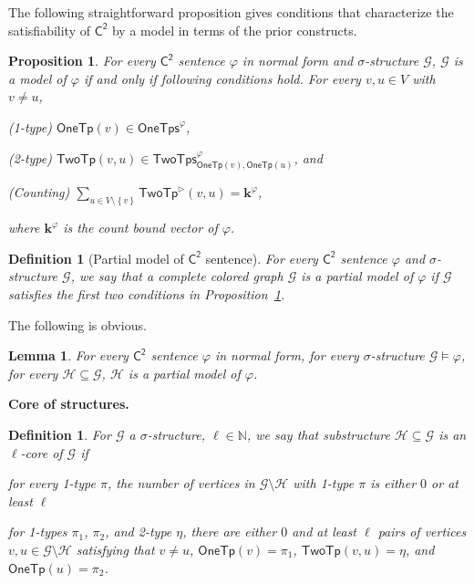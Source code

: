 \documentclass[10pt,a4paper]{article}
\newtheorem{lemma}[theorem]{Lemma}
\newtheorem{proposition}[theorem]{Proposition}
\newtheorem{definition}[theorem]{Definition}
\theoremstyle{definition}
\theoremstyle{remark}
\newcommand{\myparagraph}[1]{\medskip\noindent \textbf{#1.}}
\newcommand{\cG}{\mathcal{G}}
\newcommand{\cH}{\mathcal{H}}
\newcommand{\bbN}{\mathbb{N}}
\newcommand{\bfk}{\mathbf{k}}
\newcommand{\vocab}{\sigma}
\newcommand{\Ctwo}    {\mathsf{C^2}}
\newcommand{\onetypeof}{\mathsf{OneTp}}
\newcommand{\twotypeof}{\mathsf{TwoTp}}
\newcommand{\twotypes}{\mathsf{TwoTps}}
\newcommand{\Onetypes}{\mathsf{OneTps}}
\newcommand{\set}[1]         {\left\{ #1 \right\}}
\newcommand{\trif} {\triangleright}
\begin{document}
The following straightforward proposition gives
conditions that characterize the satisfiability of $\Ctwo$ by a model in terms of the prior constructs.
\begin{proposition}\label{prop:ctwo_graph}
    For every $\Ctwo$ sentence $\varphi$ in normal form and $\vocab$-structure $\cG$,
    $\cG$ is a model of $\varphi$ if and only if following conditions hold.
    For every $v, u \in V$ with $v \neq u$,
    \begin{compactitem}
        \item (1-type) $\onetypeof(v) \in \Onetypes^\varphi$,
        \item (2-type) $\twotypeof(v, u) \in \twotypes^\varphi_{\onetypeof(v), \onetypeof(u)}$, and
        \item (Counting) $\sum_{u \in V \setminus \set{v}} \twotypeof^\trif(v, u) = \bfk^\varphi$,
    \end{compactitem}
    where $\bfk^\varphi$ is the count bound vector of $\varphi$.
\end{proposition}

\begin{definition}[Partial model of $\Ctwo$ sentence] \label{def:partial}
    For every $\Ctwo$ sentence $\varphi$ and $\vocab$-structure $\cG$,
    we say that a complete colored graph $\cG$ is a \emph{partial model} of $\varphi$
    if $\cG$ satisfies the first two conditions in Proposition~\ref{prop:ctwo_graph}.
\end{definition}

The following is obvious.
\begin{lemma}\label{lem:core_partial_model}
    For every $\Ctwo$ sentence $\varphi$ in normal form,
    for every $\vocab$-structure $\cG \models \varphi$,
    for every $\cH \subseteq \cG$,
    $\cH$ is a partial model of $\varphi$.
\end{lemma}

\myparagraph{Core of structures}
\begin{definition} \label{def:core}
    For $\cG$ a $\vocab$-structure, $\ell \in \bbN$,
    we say that substructure $\cH \subseteq \cG$ is an $\ell$-core of $\cG$ if 
    \begin{compactitem}
        \item for every 1-type $\pi$,
        the number of vertices in $\cG \setminus \cH$
        with 1-type $\pi$ is either $0$ or at least $\ell$
        \item for  1-types $\pi_1$, $\pi_2$, and 2-type $\eta$,
        there are either $0$ and at least $\ell$
        pairs of vertices $v, u \in \cG \setminus \cH$ satisfying that
        $v \neq u$,
        $\onetypeof(v) = \pi_1$,
        $\twotypeof(v, u) = \eta$,
        and $\onetypeof(u) = \pi_2$.
    \end{compactitem}
\end{definition}
\end{document}
